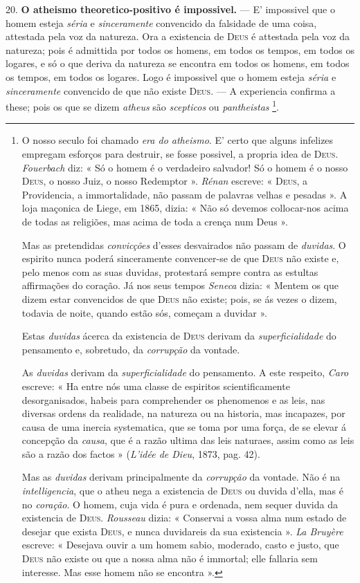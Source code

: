 20. \textbf{O atheismo theoretico-positivo é impossivel.} --- E' impossivel que o homem esteja \emph{séria} e \emph{sinceramente} convencido da falsidade de uma coisa, attestada pela voz da natureza. Ora a existencia de \textsc{Deus} é attestada pela voz da natureza; pois é admittida por todos os homens, em todos os tempos, em todos os logares, e só o que deriva da natureza se encontra em todos os homens, em todos os tempos, em todos os logares. Logo é impossivel que o homem esteja \emph{séria} e \emph{sinceramente} convencido de que não existe \textsc{Deus}. --- A experiencia confirma a these; pois os que se dizem \emph{atheus} são \emph{scepticos} ou \emph{pantheistas} \footnote{O nosso seculo foi chamado \emph{era do atheismo}. E' certo que alguns infelizes empregam esforços para destruir, se fosse possivel, a propria idea de \textsc{Deus}. \emph{Fouerbach} diz: « Só o homem é o verdadeiro salvador! Só o homem é o nosso \textsc{Deus}, o nosso Juiz, o nosso Redemptor ». \emph{Rénan} escreve: « \textsc{Deus}, a Providencia, a immortalidade, não passam de palavras velhas e pesadas ». A loja maçonica de Liege, em 1865, dizia: « Não só devemos collocar-nos acima de todas as religiões, mas acima de toda a crença num Deus ».\par Mas as pretendidas \emph{convicções} d'esses desvairados não passam de \emph{duvidas}. O espirito nunca poderá sinceramente convencer-se de que \textsc{Deus} não existe e, pelo menos com as suas duvidas, protestará sempre contra as estultas affirmações do coração. Já nos seus tempos \emph{Seneca} dizia: « Mentem os que dizem estar convencidos de que \textsc{Deus} não existe; pois, se ás vezes o dizem, todavia de noite, quando estão sós, começam a duvidar ».\par Estas \emph{duvidas} ácerca da existencia de \textsc{Deus} derivam da \emph{superficialidade} do pensamento e, sobretudo, da \emph{corrupção} da vontade.\par As \emph{duvidas} derivam da \emph{superficialidade} do pensamento. A este respeito, \emph{Caro} escreve: « Ha entre nós uma classe de espiritos scientificamente desorganisados, habeis para comprehender os phenomenos e as leis, nas diversas ordens da realidade, na natureza ou na historia, mas incapazes, por causa de uma inercia systematica, que se toma por uma força, de se elevar á concepção da \emph{causa}, que é a razão ultima das leis naturaes, assim como as leis são a razão dos factos » (\emph{L'idée de Dieu}, 1873, pag. 42).\par Mas as \emph{duvidas} derivam principalmente da \emph{corrupção} da vontade. Não é na \emph{intelligencia}, que o atheu nega a existencia de \textsc{Deus} ou duvida d'ella, mas é no \emph{coração}. O homem, cuja vida é pura e ordenada, nem sequer duvida da existencia de \textsc{Deus}. \emph{Rousseau} dizia: « Conservai a vossa alma num estado de desejar que exista \textsc{Deus}, e nunca duvidareis da sua existencia ». \emph{La Bruyère} escreve: « Desejava ouvir a um homem sabio, moderado, casto e justo, que \textsc{Deus} não existe ou que a nossa alma não é immortal; elle fallaria sem interesse. Mas esse homem não se encontra ».}.

